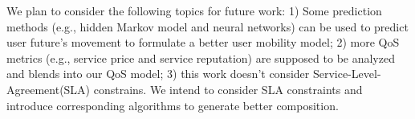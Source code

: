\documentclass[10pt,journal,compsoc]{IEEEtran}
\begin{document}
We plan to consider the following topics for future work: 1) Some prediction methods (e.g., hidden Markov model and neural networks) can be used to predict user future's movement to formulate a better user mobility model; 2) more QoS metrics (e.g., service price and service reputation) are supposed to be analyzed and blends into our QoS model; 3) this work doesn't consider Service-Level-Agreement(SLA) constrains. We intend to consider SLA constraints and introduce corresponding algorithms to generate better composition.

​		
​	





\end{document}
